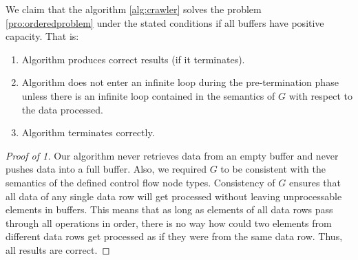   We claim that the algorithm \ref{alg:crawler} solves the problem \ref{pro:orderedproblem} under the stated conditions if all buffers have positive capacity. That is:
\begin{enumerate}
  \item Algorithm produces correct results (if it terminates).
  \item Algorithm does not enter an infinite loop during the pre-termination phase unless there is an infinite loop contained in the semantics of $G$ with respect to the data processed.
  \item Algorithm terminates correctly.
\end{enumerate}
\begin{proof}[Proof of 1]
  Our algorithm never retrieves data from an empty buffer and never pushes data into a full buffer. Also, we required $G$ to be consistent with the semantics of the defined control flow node types.  
  Consistency of $G$ ensures that all data of any single data row will get processed without leaving unprocessable elements in buffers. This means that as long as elements of all data rows pass through all operations in order, there is no way how could two elements from different data rows get processed as if they were from the same data row.  Thus, all results are correct. 
\end{proof}

